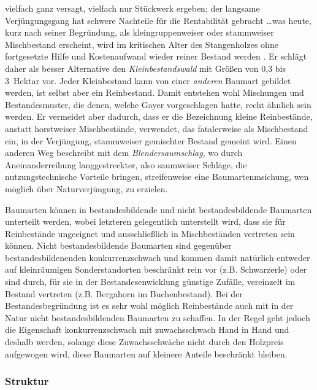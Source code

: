 \documentclass[twocolumn]{scrartcl}
\begin{document}
vielfach ganz versagt, vielfach nur Stückwerk ergeben; der langsame
Verjüngungsgang hat schwere Nachteile für die Rentabilität gebracht
\dots was heute, kurz nach seiner Begründung, als kleingruppenweiser
oder stammweiser Mischbestand erscheint, wird im kritischen Alter des
Stangenholzes ohne fortgesetzte Hilfe und Kostenaufwand wieder reiner
Bestand werden\flqq{}
\citep[S.~547]{mayr1909WaldbauAufNaturgesetzlicherGrundlage}. Er
schlägt daher als besser Alternative den \emph{Kleinbestandswald} mit
Größen von 0,3 bis 3~Hektar vor. Jeder Kleinbestand kann von einer
\emph{anderen} Baumart gebildet werden, ist selbst aber ein
Reinbestand. Damit entstehen wohl Mischungen und Bestandesmuster, die
denen, welche Gayer vorgeschlagen hatte, recht ähnlich sein werden. Er
vermeidet aber dadurch, dass er die Bezeichnung kleine Reinbestände,
anstatt horstweiser Mischbestände, verwendet, das fatalerweise als
Mischbestand ein, in der Verjüngung, stammweiser gemischter Bestand
gemeint wird. Einen anderen Weg beschreibt
\cite{wagner1923DerBlendersaumschlagUndSeinSystem} mit dem
\emph{Blendersaumschlag}, wo durch Aneinanderreihung langgestreckter,
also saumweiser Schläge, die nutzungstechnische Vorteile bringen,
streifenweise eine Baumartenmsichung, wen möglich über
Naturverjüngung, zu erzielen.

Baumarten können in bestandesbildende und nicht bestandesbildende
Baumarten unterteilt werden, wobei letzteren gelegentlich unterstellt
wird, dass sie für Reinbestände ungeeignet und ausschließlich in
Mischbeständen vertreten sein können. Nicht bestandesbildende
Baumarten sind gegenüber bestandesbildenenden konkurrenzschwach und
kommen damit natürlich entweder auf kleinräumigen Sonderstandorten
beschränkt rein vor (z.B. Schwarzerle) oder sind durch, für sie in der
Bestandesenwicklung günstige Zufälle, vereinzelt im Bestand vertreten
(z.B. Bergahorn im Buchenbestand). Bei der Bestandesbegründung ist es
sehr wohl möglich Reinbestände auch mit in der Natur nicht bestandesbildenden
Baumarten zu schaffen. In der Regel geht jedoch die Eigenschaft
konkurrenzschwach mit zuwachsschwach Hand in Hand und deshalb werden,
solange diese Zuwachsschwäche nicht durch den Holzpreis aufgewogen
wird, diese Baumarten auf kleinere Anteile beschränkt bleiben.

\subsubsection{Struktur}
\label{sssec:struktur}
\end{document}
